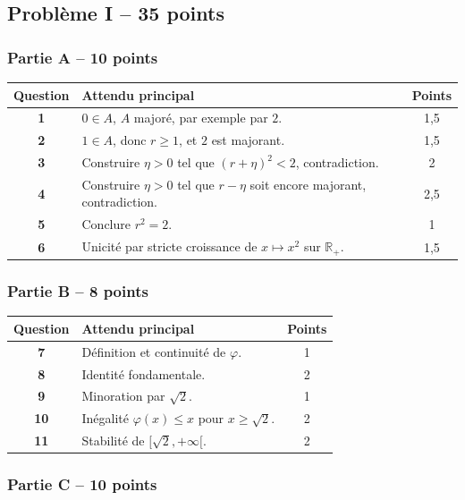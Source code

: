 \documentclass[11pt,a4paper]{article}
\newcommand{\R}{\mathbb{R}}
\begin{document}


\subsection*{Problème I -- 35 points}

\subsubsection*{Partie A -- 10 points}

\begin{tabularx}{\linewidth}{>{\bfseries}c X c}
\toprule
Question & Attendu principal & Points \\
\midrule
1 & \(0\in A\), \(A\) majoré, par exemple par \(2\). & 1,5 \\
2 & \(1\in A\), donc \(r\geq 1\), et \(2\) est majorant. & 1,5 \\
3 & Construire \(\eta>0\) tel que \((r+\eta)^2<2\), contradiction. & 2 \\
4 & Construire \(\eta>0\) tel que \(r-\eta\) soit encore majorant, contradiction. & 2,5 \\
5 & Conclure \(r^2=2\). & 1 \\
6 & Unicité par stricte croissance de \(x\mapsto x^2\) sur \(\R_+\). & 1,5 \\
\bottomrule
\end{tabularx}

\subsubsection*{Partie B -- 8 points}

\begin{tabularx}{\linewidth}{>{\bfseries}c X c}
\toprule
Question & Attendu principal & Points \\
\midrule
7 & Définition et continuité de \(\varphi\). & 1 \\
8 & Identité fondamentale. & 2 \\
9 & Minoration par \(\sqrt2\). & 1 \\
10 & Inégalité \(\varphi(x)\leq x\) pour \(x\geq\sqrt2\). & 2 \\
11 & Stabilité de \([\sqrt2,+\infty[\). & 2 \\
\bottomrule
\end{tabularx}

\subsubsection*{Partie C -- 10 points}
\end{document}
